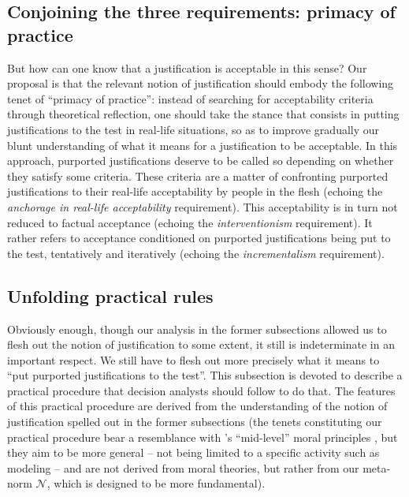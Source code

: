 \documentclass[preprint, french, english, 11pt, authoryear]{elsarticle}%
\begin{document}
\subsection{Conjoining the three requirements: primacy of practice}
But how can one know that a justification is acceptable in this sense? %
Our proposal is that the relevant notion of justification should embody the following tenet of “primacy of practice”: instead of searching for acceptability criteria through theoretical reflection, one should take the stance that consists in putting justifications to the test in real-life situations, so as to improve gradually our blunt understanding of what it means for a justification to be acceptable. In this approach, purported justifications deserve to be called so depending on whether they satisfy some criteria. These criteria are a matter of confronting purported justifications to their real-life acceptability by people in the flesh (echoing the \emph{anchorage in real-life acceptability} requirement). This acceptability is in turn not reduced to factual acceptance (echoing the \emph{interventionism} requirement). It rather refers to acceptance conditioned on purported justifications being put to the test, tentatively and iteratively (echoing the \emph{incrementalism} requirement).

\subsection{Unfolding practical rules}
Obviously enough, though our analysis in the former subsections allowed us to flesh out the notion of justification to some extent, it still is indeterminate in an important respect. We still have to flesh out more precisely what it means to ``put purported justifications to the test''. This subsection is devoted to describe a practical procedure that decision analysts should follow to do that. The features of this practical procedure are derived from the understanding of the notion of justification spelled out in the former subsections (the tenets constituting our practical procedure bear a resemblance with \citeauthor{diekmann_moral_2013}’s \citeyearpar{diekmann_moral_2013} ``mid-level'' moral principles , but they aim to be more general -- not being limited to a specific activity such as modeling -- and are not derived from moral theories, but rather from our meta-norm $\mathscr{N}$, which is designed to be more fundamental).
\end{document}
